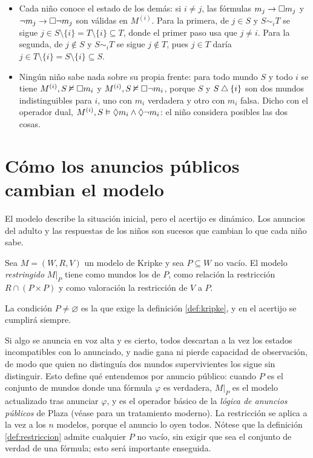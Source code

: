 \begin{itemize}
    \item Cada niño conoce el estado de los demás: si $i \ne j$, las fórmulas $m_j \to \square m_j$ y $\lnot m_j \to \square\lnot m_j$ son válidas en $M^{(i)}$. Para la primera, de $j \in S$ y $S \sim_i T$ se sigue $j \in S \setminus \{i\} = T \setminus \{i\} \subseteq T$, donde el primer paso usa que $j \ne i$. Para la segunda, de $j \notin S$ y $S \sim_i T$ se sigue $j \notin T$, pues $j \in T$ daría $j \in T\setminus\{i\} = S \setminus\{i\} \subseteq S$.
    \item Ningún niño sabe nada sobre su propia frente: para todo mundo $S$ y todo $i$ se tiene $M^{(i)}, S \nvDash \square m_i$ y $M^{(i)}, S \nvDash \square\lnot m_i$, porque $S$ y $S \mathbin{\triangle}\{i\}$ son dos mundos indistinguibles para $i$, uno con $m_i$ verdadera y otro con $m_i$ falsa. Dicho con el operador dual, $M^{(i)}, S \vDash \lozenge m_i \land \lozenge\lnot m_i$: el niño considera posibles las dos cosas.
\end{itemize}

\section{Cómo los anuncios públicos cambian el modelo}\label{sec:anuncios}

El modelo describe la situación inicial, pero el acertijo es dinámico. Los anuncios del adulto y las respuestas de los niños son sucesos que cambian lo que cada niño sabe.

\begin{definicion}[Restricción]\label{def:restriccion}
Sea $M = (W, R, V)$ un modelo de Kripke y sea $P \subseteq W$ no vacío. El modelo \emph{restringido} $M|_P$ tiene como mundos los de $P$, como relación la restricción $R \cap (P \times P)$ y como valoración la restricción de $V$ a $P$.
\end{definicion}

La condición $P \ne \varnothing$ es la que exige la definición \ref{def:kripke}, y en el acertijo se cumplirá siempre.

Si algo se anuncia en voz alta y es cierto, todos descartan a la vez los estados incompatibles con lo anunciado, y nadie gana ni pierde capacidad de observación, de modo que quien no distinguía dos mundos supervivientes los sigue sin distinguir. Esto define qué entendemos por anuncio público: cuando $P$ es el conjunto de mundos donde una fórmula $\varphi$ es verdadera, $M|_P$ es el modelo actualizado tras anunciar $\varphi$, y es el operador básico de la \emph{lógica de anuncios públicos} de Plaza \cite{plaza} (véase \cite{ditmarsch} para un tratamiento moderno). La restricción se aplica a la vez a los $n$ modelos, porque el anuncio lo oyen todos. Nótese que la definición \ref{def:restriccion} admite cualquier $P$ no vacío, sin exigir que sea el conjunto de verdad de una fórmula; esto será importante enseguida.

